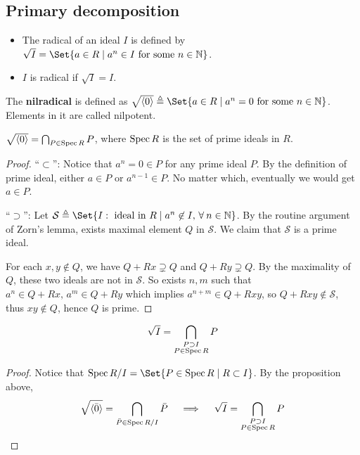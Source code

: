 \subsection{Primary decomposition}
\begin{definition} \hfill
  \begin{itemize}
    \item The radical of an ideal $I$ is defined by $\sqrt{I} = \Set{ a \in R \mid a^n \in I \text{ for some } n \in \Nb}$.
    \item $I$ is radical if $\sqrt{I} = I$.
  \end{itemize}
\end{definition}

\begin{definition}
  The {\bf nilradical} is defined as $\sqrt{\langle 0 \rangle} \triangleq
  \Set{ a \in R \mid a^n = 0 \text{ for some } n \in \Nb}$.
  Elements in it are called nilpotent.
\end{definition}

\begin{prop}
  $\sqrt{ \langle 0 \rangle } = \bigcap_{P \in \operatorname{Spec} R} P$, where $\operatorname{Spec} R$ is the set of prime
  ideals in $R$.

  \begin{proof}
    ``$\subset$'': Notice that $a^n = 0 \in P$ for any prime ideal $P$. By the definition of
    prime ideal, either $a \in P$ or $a^{n-1} \in P$. No matter which, eventually we would get
    $a \in P$.

    ``$\supset$'':
    Let $\mathcal{S} \triangleq \Set{ I : \text{ ideal in } R \mid a^n \not\in I, \, \forall n \in \Nb}$.
    By the routine argument of Zorn's lemma, exists maximal element $Q$ in $\mathcal{S}$.
    We claim that $\mathcal{S}$ is a prime ideal.

    For each $x, y \not\in Q$, we have $Q + Rx \supsetneq Q$ and $Q + Ry \supsetneq Q$.
    By the maximality of $Q$, these two ideals are not in $\mathcal{S}$.
    So exists $n, m$ such that $a^n \in Q + Rx,\, a^m \in Q + Ry$ which implies
    $a^{n+m} \in Q + Rxy$, so $Q + Rxy \not\in \mathcal{S}$, thus $xy \not\in Q$,
    hence $Q$ is prime.
  \end{proof}
\end{prop}

\begin{coro} \label{coro:equation-of-sqrt-ideal}
  \[ \sqrt{I} = \bigcap_{\substack{P \supset I \\ P \in \operatorname{Spec} R}} P \]

  \begin{proof}
    Notice that $\Spec \quot{R}{I} = \Set{P \in \Spec R \mid R \subset I}$.
    By the proposition above,
    \[ \sqrt{\langle \bar0 \rangle} = \bigcap_{\bar{P} \in \operatorname{Spec} {R}/{I}} \bar{P}
      \quad \implies \quad \sqrt{I} = \bigcap_{\substack{P \supset I \\ P \in \operatorname{Spec} R}} P \]
    \end{proof}
\end{coro}

